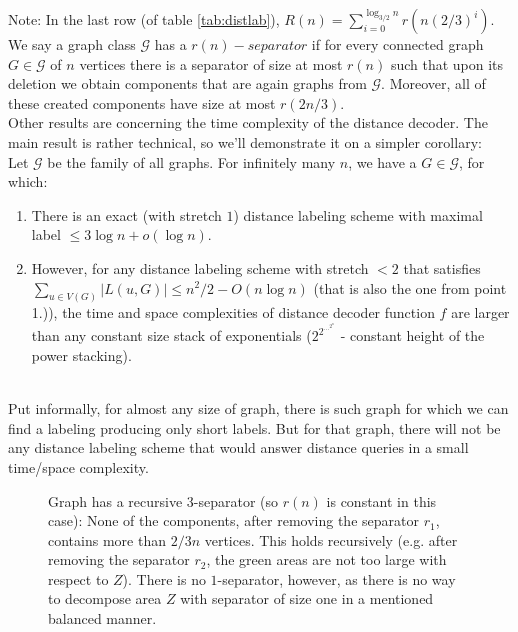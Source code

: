 \documentclass[a4paper]{article}
\newcommand{\inputTikZ}[1]{%
  }
\newcommand{\inputTikZ}[1]{%
    \beginpgfgraphicnamed{#1-external}%
    \endpgfgraphicnamed%
  }
\begin{document}
        \def\resseparator{There exists an exact distance labeling scheme with the overall size $O(n R(n) \log n + n \log^{2} n)$ and distance computing in $O(\log n)$ time for a graph having $r(n)-separator$}

        Note: In the last row (of table \ref{tab:distlab}), \def\defbigrn{$R(n) = \sum^{\log_{3/2} n}_{i=0} r(n(2/3)^i)$}\defbigrn. \def\defseparator{We say a graph class $\mathcal{G}$ has a {\boldmath$r(n)-separator$} if for every connected graph $G \in \mathcal{G}$ of $n$ vertices there is a separator of size at most $r(n)$ such that upon its deletion we obtain components that are again graphs from $\mathcal{G}$. Moreover, all of these created components have size at most $r(2n/3)$.}\defseparator\\

        Other results are concerning the time complexity of the distance decoder. The main result is rather technical, so we'll demonstrate it on a simpler corollary: \\

        \def\restimelabelgeneral{Let $\mathcal{G}$ be the family of all graphs. For infinitely many $n$, we have a $G \in \mathcal{G}$, for which:
        \begin{enumerate}
            \item There is an exact (with stretch $1$) distance labeling scheme with maximal label $\leq 3\log n + o(\log n)$.
            \item However, for any distance labeling scheme with stretch $< 2$ that satisfies $\sum_{u \in V(G)} |L(u, G)| \leq n^{2} / 2 - O(n \log n)$ (that is also the one from point 1.)), the time and space complexities of distance decoder function $f$ are larger than any constant size stack of exponentials ($2^{2^{\dots^{2^{n}}}}$ - constant height of the power stacking).
        \end{enumerate}}\restimelabelgeneral
        {\hfill}\\

        Put informally, for almost any size of graph, there is such graph for which we can find a labeling producing only short labels. But for that graph, there will not be any distance labeling scheme that would answer distance queries in a small time/space complexity.

        \begin{figure}[h!]
            \scriptsize
            \begin{center}
                \inputTikZ{./tikzpics/separator}
            \end{center}
            \caption{\label{fig:distanceseparator} Graph has a recursive $3$-separator (so $r(n)$ is constant in this case): None of the components, after removing the separator $r_1$, contains more than $2/3 n$ vertices. This holds recursively (e.g. after removing the separator $r_2$, the green areas are not too large with respect to $Z$). There is no $1$-separator, however, as there is no way to decompose area $Z$ with separator of size one in a mentioned balanced manner.}
        \end{figure}
\end{document}
